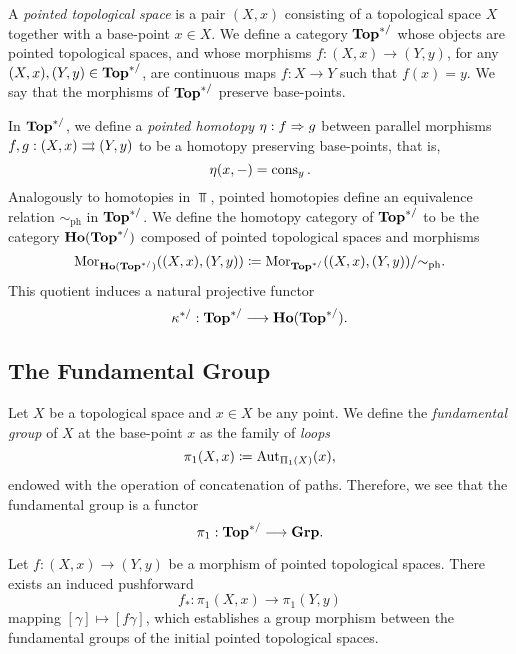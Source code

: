 \begin{definition}
\label{def:base-point-preserving-Top-cat}
A \emph{pointed topological space} is a pair \((X, x)\) consisting of a
topological space \(X\) together with a base-point \(x \in X\). We define a
category \({\textbf{Top}^{*/}}\) whose objects are pointed topological spaces, and whose
morphisms \(f: (X, x) \to (Y, y)\), for any \((X, x), (Y, y) \in {\textbf{Top}^{*/}}\), are
continuous maps \(f: X \to Y\) such that \(f(x) = y\). We say that the morphisms
of \({\textbf{Top}^{*/}}\) preserve base-points.

In \({\textbf{Top}^{*/}}\), we define a \emph{pointed homotopy} \(\eta: f \Rightarrow g\) between
parallel morphisms \(f, g: (X, x) \rightrightarrows (Y, y)\) to be a homotopy preserving
base-points, that is,
\[
\eta(x, -) = \operatorname{cons}_y.
\]
Analogously to homotopies in \(\Top\), pointed homotopies define an equivalence
relation \(\sim_{\text{ph}}\) in \({\textbf{Top}^{*/}}\). We define the homotopy category of
\({\textbf{Top}^{*/}}\) to be the category \({\textbf{Ho}({\textbf{Top}^{*/}})}\) composed of pointed topological
spaces and morphisms
\[
\operatorname{Mor}_{{\textbf{Ho}({\textbf{Top}^{*/}})}}((X, x), (Y, y))
\coloneq \operatorname{Mor}_{{\textbf{Top}^{*/}}}((X, x), (Y, y))/{\sim_{\text{ph}}}.
\]
This quotient induces a natural projective functor
\[
\kappa^{*/}: {\textbf{Top}^{*/}} \longrightarrow {\textbf{Ho}({\textbf{Top}^{*/}})}.
\]
\end{definition}

\subsection{The Fundamental Group}

\begin{definition}
\label{def:fundamental-group}
Let \(X\) be a topological space and \(x \in X\) be any point. We define
the \emph{fundamental group} of \(X\) at the base-point \(x\) as the family of
\emph{loops}
\[
\pi_1(X, x) \coloneq \operatorname{Aut}_{\Pi_1(X)}(x),
\]
endowed with the operation of concatenation of paths. Therefore, we see that the
fundamental group is a functor
\[
\pi_1: {\textbf{Top}^{*/}} \longrightarrow {\textbf{Grp}}.
\]
\end{definition}

\begin{definition}[Pushforwards in \(\pi_1\)]
\label{def:pushforward-pi1}
Let \(f: (X, x) \to (Y, y)\) be a morphism of pointed topological spaces. There
exists an induced pushforward
\[
f_{*}: \pi_1(X, x) \longrightarrow \pi_1(Y, y)
\]
mapping \([\gamma] \mapsto [f \gamma]\), which establishes a group morphism
between the fundamental groups of the initial pointed topological spaces.
\end{definition}

